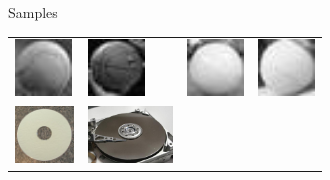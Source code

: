 \documentclass{beamer}
\newcommand{\samplesheight}{1.5cm}
\begin{document}
\begin{frame}{Samples}
\begin{table}[H]
\begin{tabularx}{\textwidth}{@{}XXXX@{}}
			\includegraphics[height=\samplesheight]{training_images/positive/n02799071_17616.thumbnail.jpg} &
			\includegraphics[height=\samplesheight]{training_images/positive/n02802426_6256.thumbnail.jpg} &
			\includegraphics[height=\samplesheight]{training_images/positive/n03145719_8658.thumbnail.jpg} &
			\includegraphics[height=\samplesheight]{training_images/positive/n04409515_2793.thumbnail.jpg} \\
			\includegraphics[height=\samplesheight]{training_images/hard_negative/n03208556_9694} &
			\includegraphics[height=\samplesheight]{training_images/hard_negative/n03208556_11973} &

\end{tabularx}
\end{table}
\end{frame}
\end{document}
